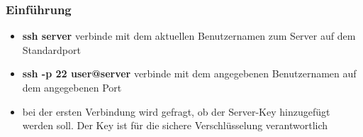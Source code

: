 \begin{frame}
\frametitle{Einführung}
\begin{itemize}
\item \textbf{ssh server} verbinde mit dem aktuellen Benutzernamen zum Server auf dem Standardport
\pause
\item \textbf{ssh -p 22 user@server} verbinde mit dem angegebenen Benutzernamen auf dem angegebenen Port
\pause
\item bei der ersten Verbindung wird gefragt, ob der Server-Key hinzugefügt werden soll. Der Key ist für die sichere Verschlüsselung verantwortlich 
\end{itemize}
\end{frame}